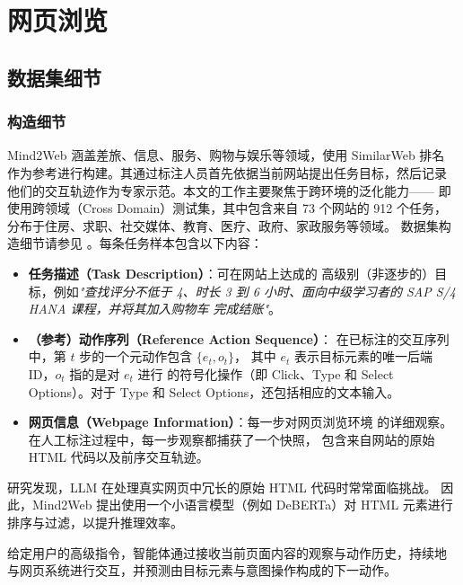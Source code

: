 
\section{网页浏览}\label{app:wb}

\subsection{数据集细节}

\subsubsection*{构造细节}

Mind2Web 涵盖差旅、信息、服务、购物与娱乐等领域，使用 SimilarWeb 排名
作为参考进行构建。其通过标注人员首先依据当前网站提出任务目标，然后记录
他们的交互轨迹作为专家示范。本文的工作主要聚焦于跨环境的泛化能力——
即使用跨领域（Cross Domain）测试集，其中包含来自 73 个网站的 912 个任务，
分布于住房、求职、社交媒体、教育、医疗、政府、家政服务等领域。
数据集构造细节请参见 \citet{deng2023}。每条任务样本包含以下内容：
\begin{itemize}
    \item \textbf{任务描述（Task Description）}：可在网站上达成的
          高级别（非逐步的）目标，例如\emph{"查找评分不低于 4、时长
          3 到 6 小时、面向中级学习者的 SAP S/4 HANA 课程，并将其加入购物车
          完成结账"}。
    \item \textbf{（参考）动作序列（Reference Action Sequence）}：
          在已标注的交互序列中，第 $t$ 步的一个元动作包含 $\{e_t, o_t\}$，
          其中 $e_t$ 表示目标元素的唯一后端 ID，$o_t$ 指的是对 $e_t$ 进行
          的符号化操作（即 Click、Type 和 Select Options）。对于 Type 和
          Select Options，还包括相应的文本输入。
    \item \textbf{网页信息（Webpage Information）}：每一步对网页浏览环境
          的详细观察。在人工标注过程中，每一步观察都捕获了一个快照，
          包含来自网站的原始 HTML 代码以及前序交互轨迹。
\end{itemize}

研究发现，LLM 在处理真实网页中冗长的原始 HTML 代码时常常面临挑战。
因此，Mind2Web 提出使用一个小语言模型（例如 DeBERTa）对 HTML 元素进行
排序与过滤，以提升推理效率。

给定用户的高级指令，智能体通过接收当前页面内容的观察与动作历史，持续地
与网页系统进行交互，并预测由目标元素与意图操作构成的下一动作。

